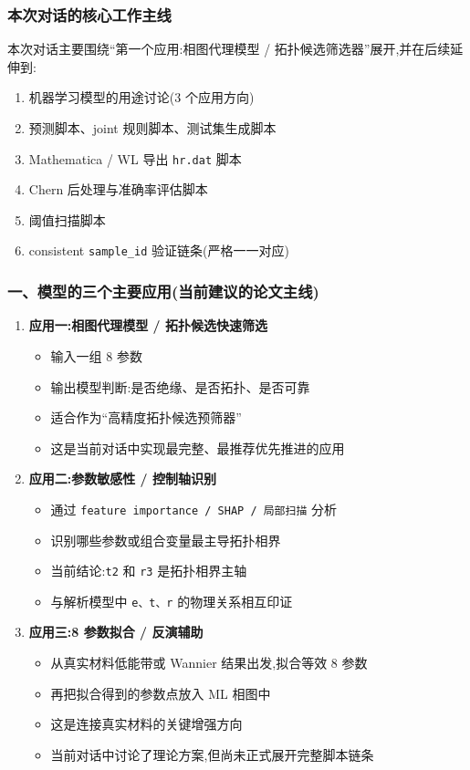 \documentclass[lang=cn,scheme=chinese,color=blue,device=normal,toc=onecol,math=cm]{elegantbook}
\begin{document}
\subsubsection{本次对话的核心工作主线}


本次对话主要围绕“第一个应用:相图代理模型 /\allowbreak{} 拓扑候选筛选器”展开,并在后续延伸到:\par


\begin{enumerate}
\item 机器学习模型的用途讨论(3 个应用方向)
\item 预测脚本、joint 规则脚本、测试集生成脚本
\item Mathematica /\allowbreak{} WL 导出 \texttt{hr.dat} 脚本
\item Chern 后处理与准确率评估脚本
\item 阈值扫描脚本
\item consistent \texttt{sample\_\allowbreak{}id} 验证链条(严格一一对应)
\end{enumerate}


\subsubsection{一、模型的三个主要应用(当前建议的论文主线)}


\begin{enumerate}
\item \textbf{应用一:相图代理模型 /\allowbreak{} 拓扑候选快速筛选} 
\begin{itemize}
\item 输入一组 8 参数
\item 输出模型判断:是否绝缘、是否拓扑、是否可靠
\item 适合作为“高精度拓扑候选预筛器”
\item 这是当前对话中实现最完整、最推荐优先推进的应用
\end{itemize}
\item \textbf{应用二:参数敏感性 /\allowbreak{} 控制轴识别} 
\begin{itemize}
\item 通过 \texttt{feature importance /\allowbreak{} SHAP /\allowbreak{} 局部扫描} 分析
\item 识别哪些参数或组合变量最主导拓扑相界
\item 当前结论:\texttt{t2} 和 \texttt{r3} 是拓扑相界主轴
\item 与解析模型中 \texttt{e、t、r} 的物理关系相互印证
\end{itemize}
\item \textbf{应用三:8 参数拟合 /\allowbreak{} 反演辅助} 
\begin{itemize}
\item 从真实材料低能带或 Wannier 结果出发,拟合等效 8 参数
\item 再把拟合得到的参数点放入 ML 相图中
\item 这是连接真实材料的关键增强方向
\item 当前对话中讨论了理论方案,但尚未正式展开完整脚本链条
\end{itemize}
\end{enumerate}
\end{document}

